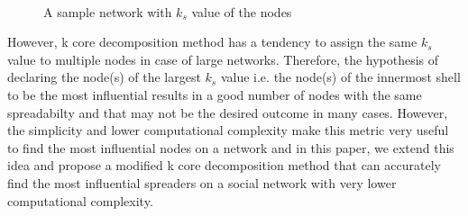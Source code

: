 \documentclass[sigconf]{acmart}
\newcommand{\graphicsplaceholder}[2]{%
	\begin{tcolorbox}[valign=center,width=#1,height=#2,arc=0.5mm,auto outer arc]%
		\centering%
		\sf missing graphic%
	\end{tcolorbox}%
}
\begin{document}
\begin{itemize}
	\begin{figure}[htpb]
		\centering
		\\
		\caption{A sample network with $k_s$ value of the nodes}
		\label{k core}
	\end{figure}

	However, k core decomposition method has a tendency to assign the same $k_s$ value to multiple nodes in case of large networks. Therefore, the hypothesis of declaring the node(s) of the largest $k_s$ value i.e. the node(s) of the innermost shell to be the most influential results in a good number of nodes with the same spreadabilty and that may not be the desired outcome in many cases. However, the simplicity and lower computational complexity make this metric very useful to find the most influential nodes on a network and in this paper, we extend this idea and propose a modified k core decomposition method that can accurately find the most influential spreaders on a social network with very lower computational complexity.
\end{itemize}
\end{document}

